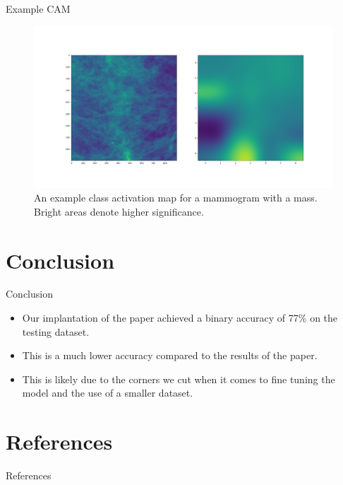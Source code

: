 \documentclass{beamer}
\begin{document}
\begin{frame}{Example CAM}
  \begin{figure}
  \begin{center}
    \includegraphics[width=\textwidth]{../docs/classActivationMap}
  \end{center}
  \caption{An example class activation map for a mammogram with a mass. Bright
    areas denote higher significance.}
  \label{fig:ClassActivationMap}
  \end{figure}
\end{frame}

\section{Conclusion}

\begin{frame}{Conclusion}
  \begin{itemize}
    \item Our implantation of the paper achieved a binary accuracy of
      \alert{77\%} on the testing dataset.
    \item This is a much lower accuracy compared to the results of the paper.
    \item This is likely due to the corners we cut when it comes to fine tuning
      the model and the use of a smaller dataset.
  \end{itemize}
\end{frame}

\section{References}

\begin{frame}[allowframebreaks]{References}
  \printbibliography[heading=none]
\end{frame}
\end{document}
